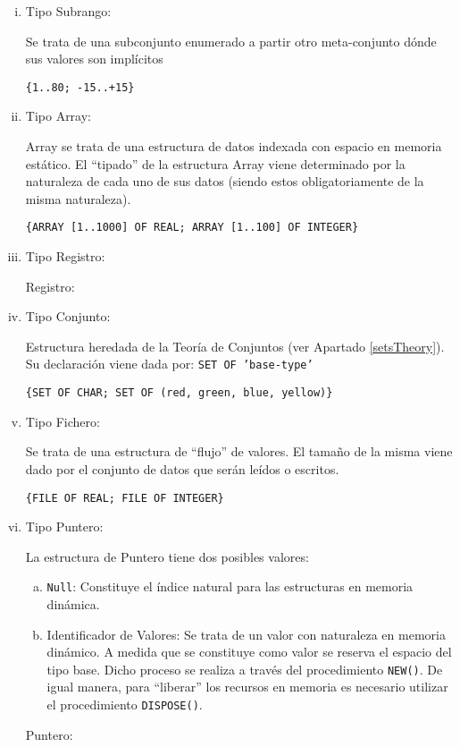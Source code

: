 \begin{enumerate}[I.]
{\begin{enumerate}[i.]
{\ejem \texttt{(red, green, blue, yellow)}
}

\item {}Tipo Subrango: { Se trata de una subconjunto enumerado a partir otro meta-conjunto dónde sus valores son implícitos 

\ejem \texttt{\{1..80; -15..+15\}}
}

\item {}Tipo Array: {Array se trata de una estructura de datos indexada con espacio en memoria estático. El ``tipado'' de la estructura Array viene determinado por la naturaleza de cada uno de sus datos (siendo estos obligatoriamente de la misma naturaleza).

\ejem \texttt{\{ARRAY [1..1000] OF REAL; ARRAY [1..100] OF INTEGER\}}
}

\item {}Tipo Registro: {




\ejem Registro: 
{

}

}

\item {}Tipo Conjunto: {Estructura heredada de la Teoría de Conjuntos (ver Apartado \ref{setsTheory}). Su declaración viene dada por: \texttt{SET OF 'base-type'}

\ejem \texttt{\{SET OF CHAR; SET OF (red, green, blue, yellow)\}}
}

\item {}Tipo Fichero: {Se trata de una estructura de ``flujo'' de valores. El tamaño de la misma viene dado por el conjunto de datos que serán leídos o escritos.

\ejem \texttt{\{FILE OF REAL; FILE OF INTEGER\}}
}

\item {}Tipo Puntero: {La estructura de Puntero tiene dos posibles valores:

\begin{enumerate}[a.]
\item \texttt{Null}: Constituye el índice natural para las estructuras en memoria dinámica.
\item Identificador de Valores: Se trata de un valor con naturaleza en memoria dinámico. A medida que se constituye como valor se reserva el espacio del tipo base. Dicho proceso se realiza a través del procedimiento \texttt{NEW()}. De igual manera, para ``liberar'' los recursos en memoria es necesario utilizar el procedimiento \texttt{DISPOSE()}.
\end{enumerate}
\ejem Puntero:
{

}


}

\end{enumerate}

}

\end{enumerate}


